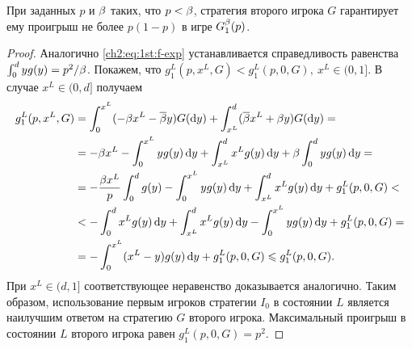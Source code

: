 {\begin{lemma}
  \label{ch2:lem:1st:upper-bound}
  При заданных $p$ и $\beta$ таких, что $p < \beta$, стратегия второго игрока $G$ гарантирует ему проигрыш не более $p(1-p)$ в игре $G^{\beta}_1(p)$.
\end{lemma}
\begin{proof}
  Аналогично \eqref{ch2:eq:1st:f-exp} устанавливается справедливость равенства $\int_0^d y g(y) = p^2/\beta$.
  Покажем, что $g^L_1(p, x^L, G) < g^L_1(p, 0, G),\ x^L \in (0, 1]$.
  В случае $x^L \in (0, d]$ получаем
  \begin{align*}
    g^L_1(p, x^L, G)
    &= \int_0^{x^L} (-\Co x^L - \DCo y) G(\di y) + \int_{x^L}^d(\DCo x^L + \Co y) G(\di y) = \\
    &= - \Co x^L - \int_0^{x^L} y g(y) \di y + \int_{x^L}^d x^L g(y) \di y + \Co \int_0^d y g(y) \di y = \\
    &= - \frac{\Co x^L}{p} \int_0^d g(y) - \int_0^{x^L} y g(y) \di y + \int_{x^L}^d x^L g(y) \di y + g^L_1(p, 0, G) < \\
    &< -\int_0^d x^L g(y) \di y + \int_{x^L}^d x^L g(y) \di y - \int_0^{x^L} y g(y) \di y + g^L_1(p, 0, G) = \\
    &= - \int_0^{x^L} (x^L - y) g(y) \di y + g^L_1(p, 0, G) \leq g^L_1(p, 0, G).
  \end{align*}
  При $x^L \in (d, 1]$ соответствующее неравенство доказывается аналогично.
  Таким образом, использование первым игроков стратегии $I_0$ в состоянии $L$ является наилучшим ответом на стратегию $G$ второго игрока.
  Максимальный проигрыш в состоянии $L$ второго игрока равен $g^L_1(p, 0, G) = p^2$.
  

\end{proof}}
